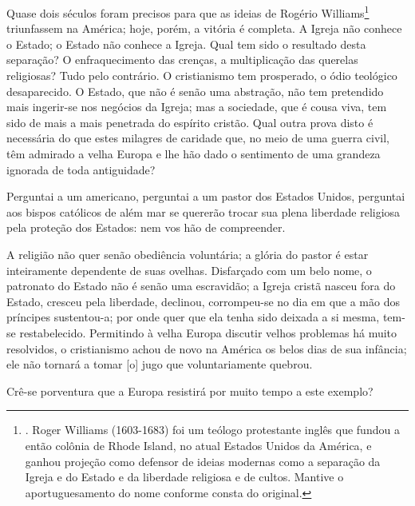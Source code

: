 Quase dois séculos foram precisos para que as ideias de Rogério
Williams\footnote{. Roger Williams (1603-1683) foi um teólogo
  protestante inglês que fundou a então colônia de Rhode Island, no
  atual Estados Unidos da América, e ganhou projeção como defensor de
  ideias modernas como a separação da Igreja e do Estado e da liberdade
  religiosa e de cultos. Mantive o aportuguesamento do nome conforme
  consta do original.} triunfassem na América; hoje, porém, a vitória é
completa. A Igreja não conhece o Estado; o Estado não conhece a Igreja.
Qual tem sido o resultado desta separação? O enfraquecimento das
crenças, a multiplicação das querelas religiosas? Tudo pelo contrário. O
cristianismo tem prosperado, o ódio teológico desaparecido. O Estado,
que não é senão uma abstração, não tem pretendido mais ingerir-se nos
negócios da Igreja; mas a sociedade, que é cousa viva, tem sido de mais
a mais penetrada do espírito cristão. Qual outra prova disto é
necessária do que estes milagres de caridade que, no meio de uma guerra
civil, têm admirado a velha Europa e lhe hão dado o sentimento de uma
grandeza ignorada de toda antiguidade?

Perguntai a um americano, perguntai a um pastor dos Estados Unidos,
perguntai aos bispos católicos de além mar se quererão trocar sua plena
liberdade religiosa pela proteção dos Estados: nem vos hão de
compreender.

A religião não quer senão obediência voluntária; a glória do pastor é
estar inteiramente dependente de suas ovelhas. Disfarçado com um belo
nome, o patronato do Estado não é senão uma escravidão; a Igreja cristã
nasceu fora do Estado, cresceu pela liberdade, declinou, corrompeu-se no
dia em que a mão dos príncipes sustentou-a; por onde quer que ela tenha
sido deixada a si mesma, tem-se restabelecido. Permitindo à velha Europa
discutir velhos problemas há muito resolvidos, o cristianismo achou de
novo na América os belos dias de sua infância; ele não tornará a tomar
{[}o{]} jugo que voluntariamente quebrou.

Crê-se porventura que a Europa resistirá por muito tempo a este exemplo?

